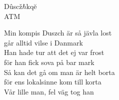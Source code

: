 {\Large Dûscž$\hbar$kqĕ}\\{\tiny  ATM}
\begin{vers}
Min kompis Duszch är så jävla lost\\
går alltid vilse i Danmark\\
Han hade tur att det ej var frost\\
för han fick sova på bar mark\\
Så kan det gå om man är helt borta\\
för ens lokalsinne kom till korta\\
Vår lille man, fel väg tog han\\
\end{vers}

